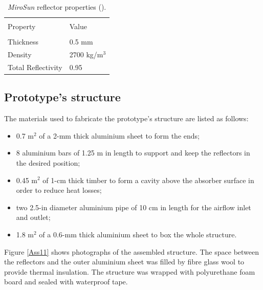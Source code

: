 \begin{table}[!ht]
	\caption{\textit{MiroSun} reflector properties (\cite{Alanod2016}).}
	\centering
	\begin{tabular}{p{5cm}p{4cm}}
		\hline \\[-12pt] 
		Property & Value \\ 
		\hline \\[-12pt] 
		Thickness & 0.5 mm \\ [3pt]
		Density & 2700 kg/m$^3$ \\ [3pt]
		Total Reflectivity & 0.95 \\ [1pt]
		\hline 
	\end{tabular} 
	\label{reflector_M}
\end{table}

\subsection{Prototype's structure}

The materials used to fabricate the prototype's structure are listed as follows:

\begin{itemize}
	\item 0.7 m$^2$ of a 2-mm thick aluminium sheet to form the ends;
	\item 8 aluminium bars of 1.25 m in length to support and keep the reflectors in the desired position;
	\item 0.45 m$^2$ of 1-cm thick timber to form a cavity above the absorber surface in order to reduce heat losses;
	\item two 2.5-in diameter aluminium pipe of 10 cm in length for the airflow inlet and outlet;
	\item 1.8 m$^2$ of a 0.6-mm thick aluminium sheet to box the whole structure.
	
\end{itemize}

Figure \ref{Ass11} shows photographs of the assembled structure. The space between the reflectors and the outer aluminium sheet was filled by fibre glass wool to provide thermal insulation. The structure was wrapped with polyurethane foam board and sealed with waterproof tape.

